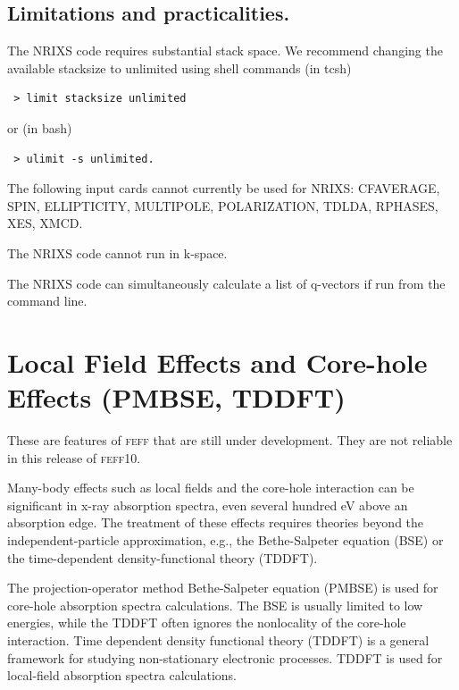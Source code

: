 \documentclass[11pt,oneside]{report} %
\newcommand{\feffcurrent}{\textsc{feff10}}
\newcommand{\program}[1]{\textsc{#1}}
\newcommand{\feff}{\program{feff}}
\begin{document}
\subsection{Limitations and practicalities.}
The NRIXS code requires substantial stack space.  We recommend changing the available stacksize to unlimited using shell commands  (in tcsh)
\begin{verbatim} > limit stacksize unlimited \end{verbatim}
or (in bash)
\begin{verbatim} > ulimit -s unlimited.\end{verbatim}

The following input cards cannot currently be used for NRIXS:
  CFAVERAGE, SPIN, ELLIPTICITY, MULTIPOLE, POLARIZATION, TDLDA, RPHASES, XES, XMCD.

The NRIXS code cannot run in k-space.

The NRIXS code can simultaneously calculate a list of q-vectors if run from the command line.  


\section{Local Field Effects and Core-hole Effects (PMBSE, TDDFT)}
\label{sec:Loc-field-core-hole}

These are features of {\feff} that are still under development. 
They are not reliable in this release of {\feffcurrent}.

Many-body effects such as local fields and the core-hole interaction 
can be significant in x-ray absorption spectra, even several hundred 
eV above an absorption edge. The treatment of these effects requires 
theories beyond the independent-particle approximation, e.g., the Bethe-Salpeter
equation (BSE) or the time-dependent density-functional theory (TDDFT).

The projection-operator method Bethe-Salpeter equation (PMBSE) is used 
for core-hole absorption spectra calculations. The BSE is usually limited 
to low energies, while the TDDFT often ignores the nonlocality of the 
core-hole interaction. Time dependent density functional theory (TDDFT) 
is a general framework for studying non-stationary electronic processes. 
TDDFT is used for local-field absorption spectra calculations. 
\end{document}
